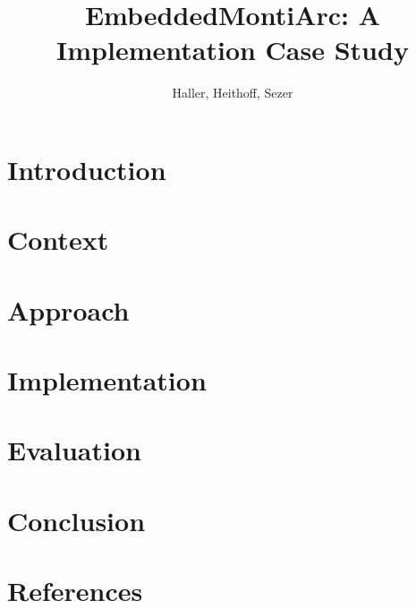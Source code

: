 \documentclass[review]{elsarticle}
\begin{document}
\begin{frontmatter}

\title{EmbeddedMontiArc: A Implementation Case Study}
\tnotetext[mytitlenote]{}

\author{Haller, Heithoff, Sezer}
\address{RWTH Aachen}



\begin{abstract}

\end{abstract}

\begin{keyword}

\end{keyword}

\end{frontmatter}

\linenumbers


\newpage
\section{Introduction}


\section{Context}


\section{Approach}


\section{Implementation}


\section{Evaluation}


\section{Conclusion}



\newpage
\section*{References}

\end{document}
